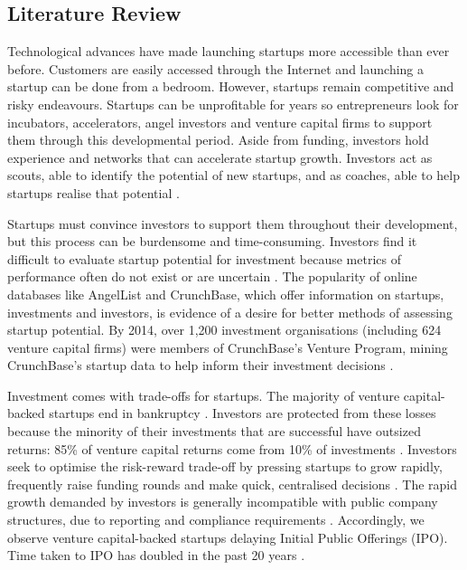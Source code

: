 \documentclass[../thesis/thesis.tex]{subfiles}
\begin{document}

\begin{refsection}


\chapter{Literature Review}\label{chap:litreview}



Technological advances have made launching startups more accessible than ever before. Customers are easily accessed through the Internet and launching a startup can be done from a bedroom. However, startups remain competitive and risky endeavours. Startups can be unprofitable for years so entrepreneurs look for incubators, accelerators, angel investors and venture capital firms to support them through this developmental period. Aside from funding, investors hold experience and networks that can accelerate startup growth. Investors act as scouts, able to identify the potential of new startups, and as coaches, able to help startups realise that potential \cite{baum2004}.

Startups must convince investors to support them throughout their development, but this process can be burdensome and time-consuming. Investors find it difficult to evaluate startup potential for investment because metrics of performance often do not exist or are uncertain \cite{shane2002}. The popularity of online databases like AngelList and CrunchBase, which offer information on startups, investments and investors, is evidence of a desire for better methods of assessing startup potential. By 2014, over 1,200 investment organisations (including 624 venture capital firms) were members of CrunchBase's Venture Program, mining CrunchBase's startup data to help inform their investment decisions \cite{patil2015}.

Investment comes with trade-offs for startups. The majority of venture capital-backed startups end in bankruptcy \cite{sahlman2010}. Investors are protected from these losses because the minority of their investments that are successful have outsized returns: 85\% of venture capital returns come from 10\% of investments \cite{sahlman2010}. Investors seek to optimise the risk-reward trade-off by pressing startups to grow rapidly, frequently raise funding rounds and make quick, centralised decisions \cite{fried2006}. The rapid growth demanded by investors is generally incompatible with public company structures, due to reporting and compliance requirements \cite{wies2015}. Accordingly, we observe venture capital-backed startups delaying Initial Public Offerings (IPO). Time taken to IPO has doubled in the past 20 years \cite{nvca2016}.


\end{refsection}
\end{document}
